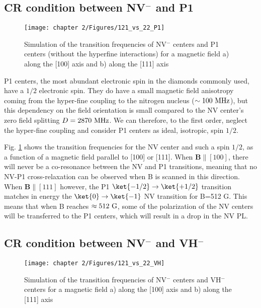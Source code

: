 \documentclass[a4paper, 11pt]{book}
\begin{document}
\subsection{CR condition between NV$^-$ and P1}

\begin{figure}[h]
\centering
\texttt{[image: chapter 2/Figures/121\_vs\_22\_P1]}
\caption{Simulation of the transition frequencies of NV$^-$ centers and P1 centers (without the hyperfine interactions) for a magnetic field a) along the [100] axis and b) along the [111] axis}
\label{121 vs 22 P1}
\end{figure}

P1 centers, the most abundant electronic spin in the diamonds commonly used, have a $1/2$ electronic spin. They do have a small magnetic field anisotropy coming from the hyper-fine coupling to the nitrogen nucleus ($\sim 100\ \rm MHz$), but this dependency on the field orientation is small compared to the NV center's zero field splitting $D=2870\ \rm MHz$. We can therefore, to the first order, neglect the hyper-fine coupling and consider P1 centers as ideal, isotropic, spin $1/2$.

Fig. \ref{121 vs 22 P1} shows the transition frequencies for the NV center and such a spin $1/2$, as a function of a magnetic field parallel to [100] or [111]. When $\mathbf{B} \parallel [100]$, there will never be a co-resonance between the NV and P1 transitions, meaning that no NV-P1 cross-relaxation can be observed when B is scanned in this direction. When $\mathbf{B} \parallel [111]$ however, the P1 $\ket{-1/2} \to \ket{+1/2}$ transition matches in energy the $\ket{0}\to\ket{-1}$ NV transition for B=512 G. This means that when B reaches $\approx 512\ \rm G$, some of the polarization of the NV centers will be transferred to the P1 centers, which will result in a drop in the NV PL. 

\subsection{CR condition between NV$^-$ and VH$^-$}

\begin{figure}[h]
\centering
\texttt{[image: chapter 2/Figures/121\_vs\_22\_VH]}
\caption{Simulation of the transition frequencies of NV$^-$ centers and VH$^-$ centers for a magnetic field a) along the [100] axis and b) along the [111] axis}
\label{121 vs 22 VH}
\end{figure}
\end{document}
